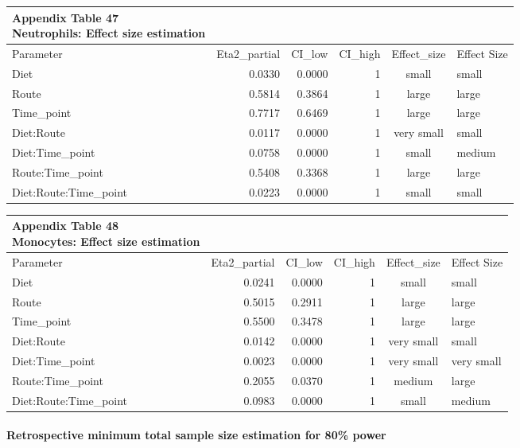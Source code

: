 \documentclass[
  12pt,
  letterpaper,
]{article}
\begin{document}
\begin{longtable}{lrrrcl}
\caption*{
{\large \textbf{Appendix Table 47}} \\ 
{\small \textbf{Neutrophils: Effect size estimation}}
} \\ 
\toprule
Parameter & Eta2\_partial & CI\_low & CI\_high & Effect\_size & Effect Size \\ 
\midrule\addlinespace[2.5pt]
Diet & 0.0330 & 0.0000 & 1 & small & small \\ 
Route & 0.5814 & 0.3864 & 1 & large & large \\ 
Time\_point & 0.7717 & 0.6469 & 1 & large & large \\ 
Diet:Route & 0.0117 & 0.0000 & 1 & very small & small \\ 
Diet:Time\_point & 0.0758 & 0.0000 & 1 & small & medium \\ 
Route:Time\_point & 0.5408 & 0.3368 & 1 & large & large \\ 
Diet:Route:Time\_point & 0.0223 & 0.0000 & 1 & small & small \\ 
\bottomrule
\end{longtable}

\begin{longtable}{lrrrcl}
\caption*{
{\large \textbf{Appendix Table 48}} \\ 
{\small \textbf{Monocytes: Effect size estimation}}
} \\ 
\toprule
Parameter & Eta2\_partial & CI\_low & CI\_high & Effect\_size & Effect Size \\ 
\midrule\addlinespace[2.5pt]
Diet & 0.0241 & 0.0000 & 1 & small & small \\ 
Route & 0.5015 & 0.2911 & 1 & large & large \\ 
Time\_point & 0.5500 & 0.3478 & 1 & large & large \\ 
Diet:Route & 0.0142 & 0.0000 & 1 & very small & small \\ 
Diet:Time\_point & 0.0023 & 0.0000 & 1 & very small & very small \\ 
Route:Time\_point & 0.2055 & 0.0370 & 1 & medium & large \\ 
Diet:Route:Time\_point & 0.0983 & 0.0000 & 1 & small & medium \\ 
\bottomrule
\end{longtable}

\paragraph{Retrospective minimum total sample size estimation for 80\% power}\label{retrospective-minimum-total-sample-size-estimation-for-80-power-1}
\end{document}
